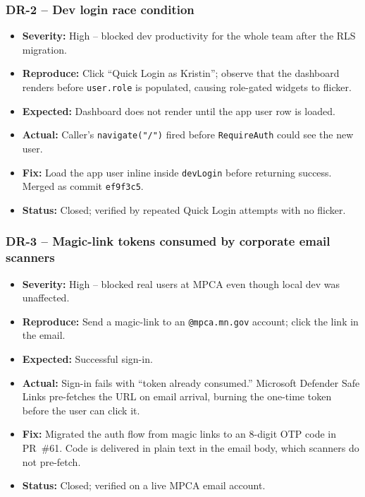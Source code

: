 \documentclass[11pt,letterpaper]{article}
\begin{document}
\subsubsection*{DR-2 -- Dev login race condition}

\begin{itemize}[noitemsep]
  \item \textbf{Severity:} High -- blocked dev productivity for
        the whole team after the RLS migration.
  \item \textbf{Reproduce:} Click ``Quick Login as Kristin'';
        observe that the dashboard renders before
        \texttt{user.role} is populated, causing role-gated
        widgets to flicker.
  \item \textbf{Expected:} Dashboard does not render until the
        app user row is loaded.
  \item \textbf{Actual:} Caller's \texttt{navigate("/")} fired
        before \texttt{RequireAuth} could see the new user.
  \item \textbf{Fix:} Load the app user inline inside
        \texttt{devLogin} before returning success. Merged as
        commit \texttt{ef9f3c5}.
  \item \textbf{Status:} Closed; verified by repeated Quick
        Login attempts with no flicker.
\end{itemize}

\subsubsection*{DR-3 -- Magic-link tokens consumed by corporate email scanners}

\begin{itemize}[noitemsep]
  \item \textbf{Severity:} High -- blocked real users at MPCA
        even though local dev was unaffected.
  \item \textbf{Reproduce:} Send a magic-link to an
        \texttt{@mpca.mn.gov} account; click the link in the
        email.
  \item \textbf{Expected:} Successful sign-in.
  \item \textbf{Actual:} Sign-in fails with ``token already
        consumed.'' Microsoft Defender Safe Links pre-fetches
        the URL on email arrival, burning the one-time token
        before the user can click it.
  \item \textbf{Fix:} Migrated the auth flow from magic links
        to an 8-digit OTP code in PR~\#61. Code is delivered
        in plain text in the email body, which scanners do not
        pre-fetch.
  \item \textbf{Status:} Closed; verified on a live MPCA email
        account.
\end{itemize}
\end{document}

